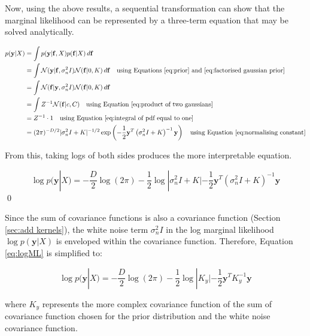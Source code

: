 \documentclass[12pt,a4paper]{article}
\begin{document}
Now, using the above results, a sequential transformation can show that the marginal likelihood can be represented by a three-term equation that may be solved analytically.

\begin{align}
p(\mathbf{y} | X) &= \int p(\mathbf{y} | \mathbf{f}, X) p(\mathbf{f} | X) \, d\mathbf{f} \nonumber \\
&= \int \mathcal{N}(\mathbf{y} | \mathbf{f}, \sigma_n^2 I) \mathcal{N}(\mathbf{f} | 0, K) \, d\mathbf{f} \quad \text{using Equations \eqref{eq:prior} and \eqref{eq:factorised gaussian prior}} \nonumber \\
&= \int \mathcal{N}(\mathbf{f} | \mathbf{y}, \sigma_n^2 I) \mathcal{N}(\mathbf{f} | 0, K) \, d\mathbf{f}  \nonumber \\
&= \int Z^{-1} \mathcal{N}(\mathbf{f} | c, C) \quad \text{using Equation \eqref{eq:product of two gaussians}} \nonumber \\
&= Z^{-1} \cdot 1 \quad \text{using Equation \eqref{eq:integral of pdf equal to one}} \nonumber \\
&= (2\pi)^{-D/2} | \sigma_n^2 I + K|^{-1/2} \exp \left( -\frac{1}{2} \mathbf{y}^T \left( \sigma_n^2 I + K \right)^{-1} \mathbf{y} \right) \quad \text{using Equation \eqref{eq:normalising constant}} \label{eq:pdf noisy gaussian}
\end{align}

From this, taking logs of both sides produces the more interpretable equation.

\begin{equation}
\log p(\mathbf{y} | X) = -\frac{D}{2} \log(2\pi) - \frac{1}{2} \log | \sigma_n^2 I + K | - \frac{1}{2} \mathbf{y}^T (\sigma_n^2 I + K)^{-1} \mathbf{y}
\label{eq:logML}
\end{equation}
\hfill \qed

Since the sum of covariance functions is also a covariance function (Section \ref{sec:add kernels}), the white noise term \(\sigma_n^2 I\) in the log marginal likelihood \(\log p(\mathbf{y} | X)\) is enveloped within the covariance function. Therefore, Equation \eqref{eq:logML} is simplified to:

\begin{equation}
\log p(\mathbf{y} | X) = -\frac{D}{2} \log(2\pi) - \frac{1}{2} \log |K_y| - \frac{1}{2} \mathbf{y}^T K_y^{-1} \mathbf{y}
\label{eq:Log Marginal Lieklihood}
\end{equation}

where \(K_y\) represents the more complex covariance function of the sum of covariance function chosen for the prior distribution and the white noise covariance function.
\end{document}
